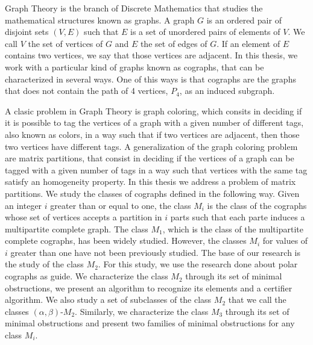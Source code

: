 Graph Theory is the branch of Discrete Mathematics that studies the mathematical structures known as graphs. A graph $G$ is an ordered pair of disjoint sets $(V,E)$ such that $E$ is a set of unordered pairs of elements of $V$. We call $V$ the set of vertices of $G$ and $E$ the set of edges of $G$. If an element of $E$ contains two vertices, we say that those vertices are adjacent. In this thesis, we work with a particular kind of graphs known as cographs, that can be characterized in several ways. One of this ways is that cographs are the graphs that does not contain the path of 4 vertices, $P_4$, as an induced subgraph.

A clasic problem in Graph Theory is graph coloring, which consits in deciding if it is possible to tag the vertices of a graph with a given number of different tags, also known as colors, in a way such that if two vertices are adjacent, then those two vertices have different tags. A generalization of the graph coloring problem are matrix partitions, that consist in deciding if the vertices of a graph can be tagged with a given number of tags in a way such that vertices with the same tag satisfy an homogeneity property. In this thesis we address a problem of matrix partitions. We study the classes of cographs defined in the following way. Given an integer $i$ greater than or equal to one, the class $M_i$ is the class of the cographs whose set of vertices accepts a partition in $i$ parts such that each parte induces a multipartite complete graph. The class $M_1$, which is the class of the multipartite complete cographs, has been widely studied. However, the classes $M_i$ for values of $i$ greater than one have not been previously studied. The base of our research is the study of the class $M_2$. For this study, we use the research done about polar cographs as guide. We characterize the class $M_2$ through its set of minimal obstructions, we present an algorithm to recognize its elements and a certifier algorithm. We also study a set of subclasses of the class $M_2$ that we call the classes $(\alpha,\beta)$-$M_2$. Similarly, we characterize the class $M_3$ through its set of minimal obstructions and present two families of minimal obstructions for any class $M_i$.